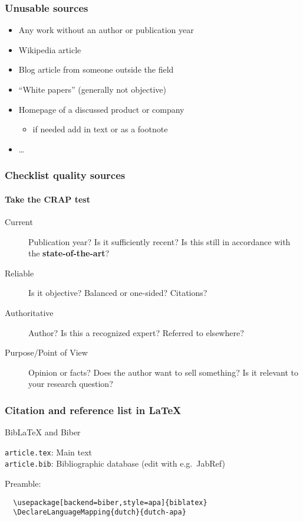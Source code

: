 \documentclass[aspectratio=169]{beamer}
\begin{document}
\begin{frame}
  \frametitle{Unusable sources}
  
  \begin{itemize}
    \item Any work without an author or publication year
    \item Wikipedia article
    \item Blog article from someone outside the field
    \item ``White papers'' (generally not objective)
    \item Homepage of a discussed product or company
    \begin{itemize}
      \item if needed add in text or as a footnote
    \end{itemize}
    \item \dots
  \end{itemize}
\end{frame}

\begin{frame}
  \frametitle{Checklist quality sources}
  \framesubtitle{Take the CRAP test}
  
  \begin{description}
    \item[Current] Publication year? Is it sufficiently recent? Is this still in accordance with the \textbf{state-of-the-art}?
    \item[Reliable] Is it objective? Balanced or one-sided?
    Citations?
    \item[Authoritative] Author? Is this a recognized expert? Referred to elsewhere?
    \item[Purpose/Point of View] Opinion or facts? Does the author want to sell something? Is it relevant to your research question?
  \end{description}
  
\end{frame}

\begin{frame}[fragile]
  \frametitle{Citation and reference list in {\LaTeX}}
  
  Bib{\LaTeX} and Biber
  
  \vspace{18pt}
  
  \verb|article.tex|: Main text\\
  \verb|article.bib|: Bibliographic database (edit with e.g.~JabRef)
  
  \vspace{18pt}
  
  Preamble:
  
  \begin{verbatim}
  \usepackage[backend=biber,style=apa]{biblatex}
  \DeclareLanguageMapping{dutch}{dutch-apa}
  
  \end{verbatim}
  
\end{frame}
\end{document}
